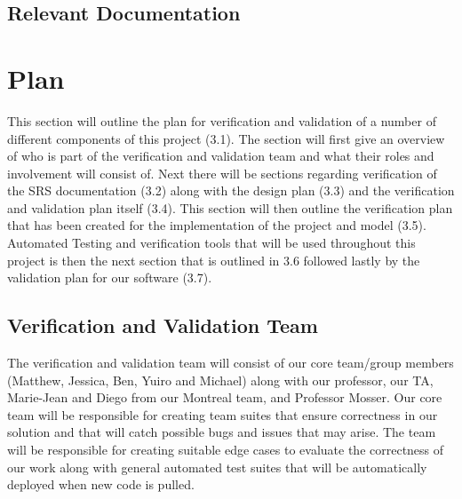 \documentclass[12pt, titlepage]{article}
\begin{document}
\subsection{Relevant Documentation}


\citet{SRS}


\section{Plan}

This section will outline the plan for verification and validation of a number of different components of this project (3.1). The section will first give an overview of who is part of the verification and validation team and what their roles and involvement will consist of. Next there will be sections regarding verification of the SRS documentation (3.2) along with the design plan (3.3) and the verification and validation plan itself (3.4). This section will then outline the verification plan that has been created for the implementation of the project and model (3.5). Automated Testing and verification tools that will be used throughout this project is then the next section that is outlined in 3.6 followed lastly by the validation plan for our software (3.7).

  \subsection{Verification and Validation Team}

  
  The verification and validation team will consist of our core team/group members (Matthew, Jessica, Ben, Yuiro and Michael) along with our professor, our TA, Marie-Jean and Diego from our Montreal team, and Professor Mosser.  Our core team will be responsible for creating team suites that ensure correctness in our solution and that will catch possible bugs and issues that may arise. The team will be responsible for creating suitable edge cases to evaluate the correctness of our work along with general automated test suites that will be automatically deployed when new code is pulled.\\
  
\end{document}
